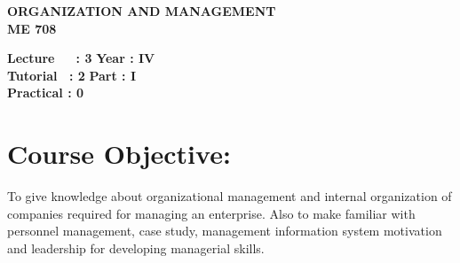 \begin{center}
    \textbf{\huge{\uppercase{Organization and Management}}}
    \\
    \vspace{.5cm}
    \textbf{\large{ME 708}}
\end{center}

\noindent\textbf{Lecture\ \ \ : 3} \hfill \textbf{Year : IV} \\
\textbf{Tutorial \ : 2} \hfill \textbf{Part : I } \\
\textbf{Practical : 0}  \\

\par
\noindent 
\section*{Course Objective:}
To give knowledge about organizational management and internal organization of companies required for managing an enterprise. Also to make familiar with personnel management, case study, management information system motivation and leadership for developing managerial skills.

